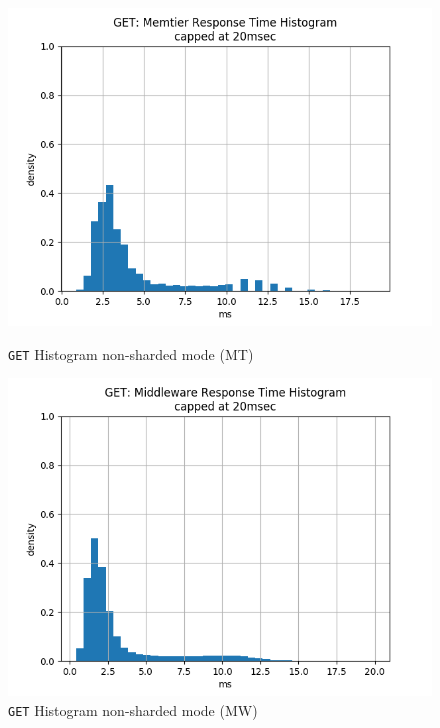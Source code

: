 \documentclass[11pt,a4paper]{article}
\begin{document}
%
\begin{figure}[H]
	\centering
	\captionsetup{width=0.4\textwidth}
    \begin{minipage}{0.5\textwidth}
        \centering
        \includegraphics[width=\textwidth]{../illustrations/plots/4_2_full_system_read/64/memtier_get_hist.png}
        \caption{\texttt{GET} Histogram non-sharded mode (MT)}
        \label{fig:full_system_read_mt_hist}
    \end{minipage}\hfill
    \begin{minipage}{0.5\textwidth}
        \centering
        \includegraphics[width=\textwidth]{../illustrations/plots/4_2_full_system_read/64/middleware_get_hist.png}
        \caption{\texttt{GET} Histogram non-sharded mode (MW)}
        \label{fig:full_system_read_mw_hist}
    \end{minipage}
\end{figure}
%
\end{document}
